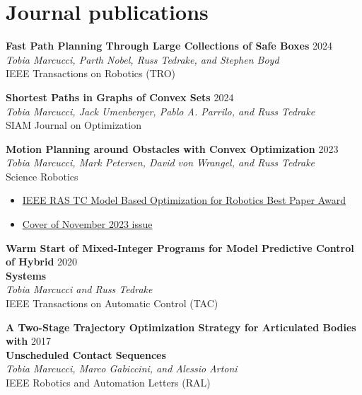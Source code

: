 \documentclass[11pt,a4paper,sans,twoside]{moderncv}
\begin{document}
\section{Journal publications}

\begin{enumerate}[label={[J\arabic*]}]

\item \textbf{Fast Path Planning Through Large Collections of Safe Boxes} \hfill 2024 \\
\textit{Tobia Marcucci, Parth Nobel, Russ Tedrake, and Stephen Boyd} \\
IEEE Transactions on Robotics (TRO)

\item \textbf{Shortest Paths in Graphs of Convex Sets} \hfill 2024 \\
\textit{Tobia Marcucci, Jack Umenberger, Pablo A. Parrilo, and Russ Tedrake} \\
SIAM Journal on Optimization

\item \textbf{Motion Planning around Obstacles with Convex Optimization} \hfill 2023 \\
\textit{Tobia Marcucci, Mark Petersen, David von Wrangel, and Russ Tedrake} \\
Science Robotics
\begin{itemize}
\item \href{https://www.tcoptrob.org/news/2024-06-12-best-paper/}{\color{cyan}IEEE RAS TC Model Based Optimization for Robotics Best Paper Award}
\item \href{https://www.science.org/toc/scirobotics/8/84}{\color{cyan}Cover of November 2023 issue}
\end{itemize} 

\item \textbf{Warm Start of Mixed-Integer Programs for Model Predictive Control of Hybrid} \hfill 2020 \\ \textbf{Systems}  \\
\textit{Tobia Marcucci and Russ Tedrake} \\
IEEE Transactions on Automatic Control (TAC)

\item \textbf{A Two-Stage Trajectory Optimization Strategy for Articulated Bodies with} \hfill 2017 \\
\textbf{Unscheduled Contact Sequences} \\
\textit{Tobia Marcucci, Marco Gabiccini, and Alessio Artoni} \\
IEEE Robotics and Automation Letters (RAL)

\end{enumerate}
\end{document}
